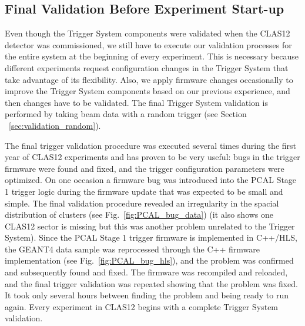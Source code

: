 








\subsection{Final Validation Before Experiment Start-up}

Even though the Trigger System components were validated when the CLAS12 detector was commissioned, we still have to execute our validation processes for the entire system at the beginning of every experiment. This is necessary because different experiments request configuration changes in the Trigger System that take advantage of its flexibility. Also, we apply firmware changes occasionally to improve the Trigger System components based on our previous experience, and then changes have to be validated. The final Trigger System validation is performed by taking beam data with a random trigger (see Section ~\ref{sec:validation_random}).

The final trigger validation procedure was executed several times during the first year of CLAS12 experiments and has proven to be very useful: bugs in the trigger firmware were found and fixed, and the trigger configuration parameters were optimized. On one occasion a firmware bug was introduced into the PCAL Stage 1 trigger logic during the firmware update that was expected to be small and simple. The final validation procedure revealed an irregularity in the spacial distribution of clusters (see Fig.~\ref{fig:PCAL_bug_data}) (it also shows one CLAS12 sector is missing but this was another problem unrelated to the Trigger System). Since the PCAL Stage 1 trigger firmware is implemented in C++/HLS, the GEANT4 data sample was reprocessed through the C++ firmware implementation (see Fig.~\ref{fig:PCAL_bug_hls}), and the problem was confirmed and subsequently found and fixed. The firmware was recompiled and reloaded, and the final trigger validation was repeated showing that the problem was fixed. It took only several hours between finding the problem and being ready to run again. Every experiment in CLAS12 begins with a complete Trigger System validation. 

